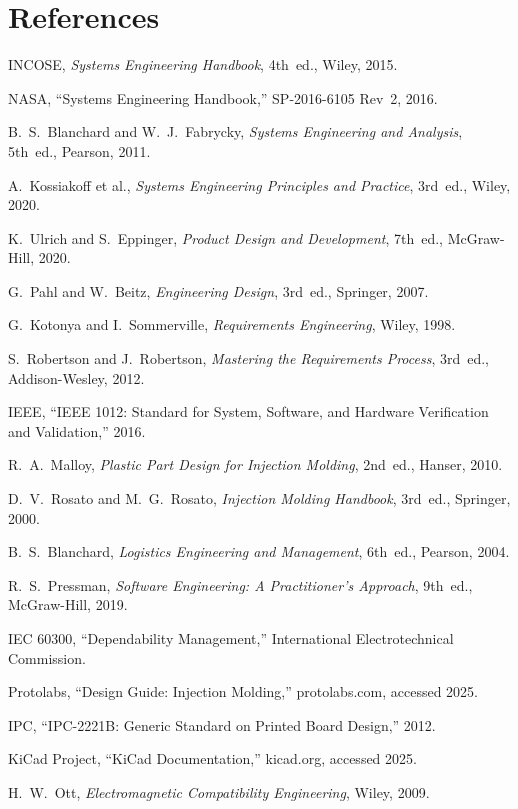 \documentclass[11pt,letterpaper,twoside,openany]{book}
\begin{document}
\chapter*{References}

\begin{enumerate}[label={[\arabic*]},leftmargin=2em]
\item INCOSE, \emph{Systems Engineering Handbook}, 4th~ed., Wiley, 2015.
\item NASA, ``Systems Engineering Handbook,'' SP-2016-6105 Rev~2, 2016.
\item B.~S.~Blanchard and W.~J.~Fabrycky, \emph{Systems Engineering and Analysis}, 5th~ed., Pearson, 2011.
\item A.~Kossiakoff et al., \emph{Systems Engineering Principles and Practice}, 3rd~ed., Wiley, 2020.
\item K.~Ulrich and S.~Eppinger, \emph{Product Design and Development}, 7th~ed., McGraw-Hill, 2020.
\item G.~Pahl and W.~Beitz, \emph{Engineering Design}, 3rd~ed., Springer, 2007.
\item G.~Kotonya and I.~Sommerville, \emph{Requirements Engineering}, Wiley, 1998.
\item S.~Robertson and J.~Robertson, \emph{Mastering the Requirements Process}, 3rd~ed., Addison-Wesley, 2012.
\item IEEE, ``IEEE 1012: Standard for System, Software, and Hardware Verification and Validation,'' 2016.
\item R.~A.~Malloy, \emph{Plastic Part Design for Injection Molding}, 2nd~ed., Hanser, 2010.
\item D.~V.~Rosato and M.~G.~Rosato, \emph{Injection Molding Handbook}, 3rd~ed., Springer, 2000.
\item B.~S.~Blanchard, \emph{Logistics Engineering and Management}, 6th~ed., Pearson, 2004.
\item R.~S.~Pressman, \emph{Software Engineering: A Practitioner's Approach}, 9th~ed., McGraw-Hill, 2019.
\item IEC 60300, ``Dependability Management,'' International Electrotechnical Commission.
\item Protolabs, ``Design Guide: Injection Molding,'' protolabs.com, accessed 2025.
\item IPC, ``IPC-2221B: Generic Standard on Printed Board Design,'' 2012.
\item KiCad Project, ``KiCad Documentation,'' kicad.org, accessed 2025.
\item H.~W.~Ott, \emph{Electromagnetic Compatibility Engineering}, Wiley, 2009.

\end{enumerate}
\end{document}
